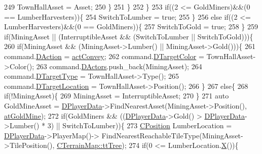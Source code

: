 \begin{DoxyCode}
249                 TownHallAsset = Asset;
250             \}
251         \}
252     \}
253     \textcolor{keywordflow}{if}((2 <= GoldMiners)&&(0 == LumberHarvesters))\{
254         SwitchToLumber = \textcolor{keyword}{true}; 
255     \}
256     \textcolor{keywordflow}{else} \textcolor{keywordflow}{if}((2 <= LumberHarvesters)&&(0 == GoldMiners))\{
257         SwitchToGold = \textcolor{keyword}{true}; 
258     \}
259     \textcolor{keywordflow}{if}(MiningAsset || (InterruptibleAsset && (SwitchToLumber || SwitchToGold)))\{
260         \textcolor{keywordflow}{if}(MiningAsset && (MiningAsset->Lumber() || MiningAsset->Gold()))\{
261             command.\hyperlink{structSPlayerCommandRequest_a80897bbccf2c4e0b148a7aa815a926c6}{DAction} = \hyperlink{GameDataTypes_8h_a35b98ce26aca678b03c6f9f76e4778cead52ccba78becf1f7411bcea19f1276a8}{actConvey};
262             command.\hyperlink{structSPlayerCommandRequest_a3690a5117efe6214d92f18d672b5714f}{DTargetColor} = TownHallAsset->Color();
263             command.\hyperlink{structSPlayerCommandRequest_aa37fc01519676345703d78b9f573894a}{DActors}.push\_back(MiningAsset);
264             command.\hyperlink{structSPlayerCommandRequest_a864e47c641127665751091876a6d3c5e}{DTargetType} = TownHallAsset->Type();
265             command.\hyperlink{structSPlayerCommandRequest_a701702b94ca2fd2738e95ef6711dd41a}{DTargetLocation} = TownHallAsset->Position();
266         \}
267         \textcolor{keywordflow}{else}\{
268             \textcolor{keywordflow}{if}(!MiningAsset)\{
269                 MiningAsset = InterruptibleAsset;   
270             \}
271             \textcolor{keyword}{auto} GoldMineAsset = \hyperlink{classCAIPlayer_a83b5113c8f7e80df54940b647c5ee2e6}{DPlayerData}->FindNearestAsset(MiningAsset->Position(), 
      \hyperlink{GameDataTypes_8h_a5600d4fc433b83300308921974477feca243d9ba44092eadd561db058d742b3b3}{atGoldMine});
272             \textcolor{keywordflow}{if}(GoldMiners && ((\hyperlink{classCAIPlayer_a83b5113c8f7e80df54940b647c5ee2e6}{DPlayerData}->Gold() > \hyperlink{classCAIPlayer_a83b5113c8f7e80df54940b647c5ee2e6}{DPlayerData}->Lumber() * 3) || 
      SwitchToLumber))\{
273                 \hyperlink{classCPosition}{CPosition} LumberLocation = \hyperlink{classCAIPlayer_a83b5113c8f7e80df54940b647c5ee2e6}{DPlayerData}->PlayerMap()->
      FindNearestReachableTileType(MiningAsset->TilePosition(), \hyperlink{classCTerrainMap_aff2ab991e237269941416dd79d8871d4a15600fc22dc08ff5a3aec20930112f8c}{CTerrainMap::ttTree});
274                 \textcolor{keywordflow}{if}(0 <= LumberLocation.\hyperlink{classCPosition_a9a6b94d3b91df1492d166d9964c865fc}{X}())\{

\end{DoxyCode}
